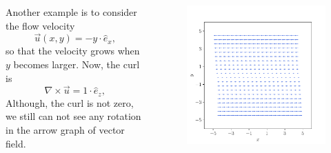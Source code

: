 \documentclass[11pt,]{beamer}
\begin{document}
\begin{frame}
	\begin{columns}[t]
		\begin{column}{0.5\textwidth}
			Another example is to consider the flow velocity 
			\begin{equation}
			\vec{u}(x,y) = -y\cdot \hat{e}_x,
			\end{equation}
			so that the velocity grows when $y$ becomes larger. Now, the curl is 
			\begin{equation}
			\nabla\times\vec{u} = 1 \cdot \hat{e}_z,
			\end{equation}
			Although, the curl is not zero, 
			we still can not see any rotation in the arrow graph of  vector field.
		\end{column}
		\begin{column}{0.5\textwidth}
			\begin{figure}
			\includegraphics[page=1, width=1.0\textwidth]{flow-(-y,0).pdf}
			\end{figure}
		\end{column}
	\end{columns}
\end{frame}
\end{document}
